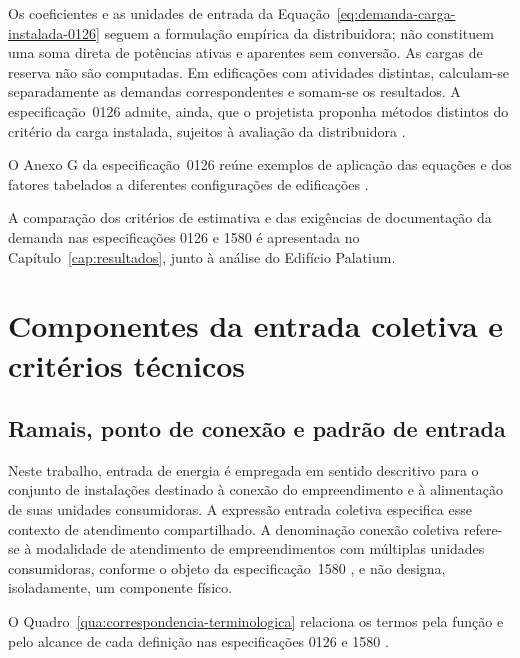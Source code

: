 Os coeficientes e as unidades de entrada da Equação~\ref{eq:demanda-carga-instalada-0126} seguem a formulação empírica da distribuidora; não constituem uma soma direta de potências ativas e aparentes sem conversão. As cargas de reserva não são computadas. Em edificações com atividades distintas, calculam-se separadamente as demandas correspondentes e somam-se os resultados. A especificação~0126 admite, ainda, que o projetista proponha métodos distintos do critério da carga instalada, sujeitos à avaliação da distribuidora \cite[itens~7.11.3.2, 7.11.3.4 e~7.11.3.5]{enel0126}.

O Anexo G da especificação~0126 reúne exemplos de aplicação das equações e dos fatores tabelados a diferentes configurações de edificações \cite[Anexo G]{enel0126}.

A comparação dos critérios de estimativa e das exigências de documentação da demanda nas especificações 0126 e 1580 é apresentada no Capítulo~\ref{cap:resultados}, junto à análise do Edifício Palatium.

\section{Componentes da entrada coletiva e critérios técnicos}
\label{sec:componentes}

\subsection{Ramais, ponto de conexão e padrão de entrada}

Neste trabalho, entrada de energia é empregada em sentido descritivo para o conjunto de instalações destinado à conexão do empreendimento e à alimentação de suas unidades consumidoras. A expressão entrada coletiva especifica esse contexto de atendimento compartilhado. A denominação conexão coletiva refere-se à modalidade de atendimento de empreendimentos com múltiplas unidades consumidoras, conforme o objeto da especificação~1580 \cite[item~1]{enel1580}, e não designa, isoladamente, um componente físico.

O Quadro~\ref{qua:correspondencia-terminologica} relaciona os termos pela função e pelo alcance de cada definição nas especificações 0126 e 1580 \cite[seção~7.6]{enel0126}\cite[item~7.15]{enel1580}.

